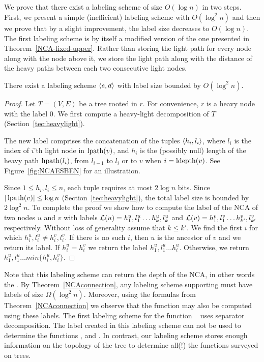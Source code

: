 \subsection{\NCAl}\label{section-NCA-designer}
		We prove that there exist a \NCAl  labeling scheme of size  $O(\log n)$ in two steps.
		First, we present a simple (inefficient) labeling scheme with $O(\log^2 n)$  and then we prove that by a slight improvement, the label size decreases to $O(\log n)$. 
		 The first labeling scheme is by itself a modified version of the one presented in Theorem~\ref{NCA-fixed-upper}.
		Rather than storing the light path for every node along with the node above it, we store the light path along with the distance of the heavy paths  between each two consecutive light nodes. 
		\begin{theorem}\label{thm:nca-designer-long}
		There exist a \NCAl labeling scheme $\left \langle e,d \right \rangle $ with label size bounded by $O (\log^2 n)$.
		\end{theorem}
		\begin{proof}
		Let $T=(V,E)$ be a tree rooted in $r$. For convenience,  $r$ is a heavy node with the  label $0$.
		We first compute a heavy-light decomposition of $T$ (Section~\ref{tec:heavylight}).

		The  new label   comprises the concatenation of the tuples  $\left \langle h_i,l_i \right \rangle $, where $l_i$ is the index of  $i$'th light node  in $\operatorname{lpath}(v)$, and $h_i$ is the (possibly null) length of the heavy path $\operatorname{hpath}(l_i)$,  from $l_{i-1}$ to $l_i$ or to $v$ when $i=\operatorname{ldepth}(v)$.
		 See Figure~\ref{fig:NCAESBEN} for an illustration.
		 
		Since $1 \leq h_i, l_i \leq n$, each tuple requires at most  $2 \log n$ bits.
		Since $\vert \operatorname{lpath}(v) \vert \leq \log n$ (Section~\ref{tec:heavylight}), the total label size is bounded by $2\log^2 n$.
		To complete the proof we show how to compute the label of the NCA of two nodes $u$ and $v$ with labels $ \mathcal{L}(u)= h_1^u,l_1^u \dots h_k^u,l_k^u$ and $ \mathcal{L}(v) =  h_1^v,l_1^v \dots h_{k'}^v,l_{k'}^v $ respectively.
		 Without loss of generality assume that $k \leq k'$.
		We find the first $i$ for which $h_i^u,l_i^u \neq  h_i^v,l_i^v$.
		If there is no such $i$, then $u$ is the ancestor of $v$ and we return its label.
		 If $h_i^u = h_i^v$    we return the label $h_1^u,l_1^u \dots h_i^u$.
		 Otherwise, we return $h_1^u,l_1^u \dots  min\{h_i^u,h_i^v\}$.
		
		 \end{proof}	
		 
		 Note that this labeling scheme can return the depth of the NCA, in other words the \seplevel.
		 By Theorem~\ref{NCAconnection}, any   labeling scheme supporting \seplevel must have labels of size $\Omega(\log^2 n)$.
	 Moreover, using the formulas from Theorem~\ref{NCAconnection}  we observe that the function  \distance may also be computed using these labels.
		The first labeling scheme for the function \distance~\cite{Peleg00} uses separator decomposition.
		The label created in this labeling scheme  can not be used to determine the  functions \NCA, \adjacency and \ancestry.
		 In contrast, our  labeling scheme  stores enough information on the topology of the tree to determine all(!) the functions surveyed on trees.
		 

